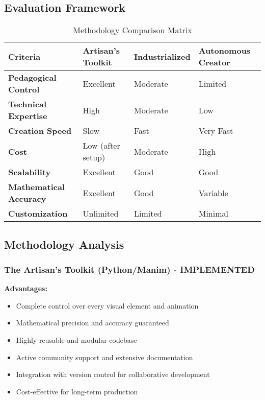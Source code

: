 \documentclass[12pt,a4paper]{article}
\begin{document}
\subsection{Evaluation Framework}
\begin{table}[h]
\centering
\begin{tabular}{|p{3cm}|p{3cm}|p{3cm}|p{3cm}|}
\hline
\textbf{Criteria} & \textbf{Artisan's Toolkit} & \textbf{Industrialized} & \textbf{Autonomous Creator} \\
\hline
\textbf{Pedagogical Control} & \cellcolor{green!20}Excellent & \cellcolor{yellow!20}Moderate & \cellcolor{red!20}Limited \\
\hline
\textbf{Technical Expertise} & \cellcolor{red!20}High & \cellcolor{yellow!20}Moderate & \cellcolor{green!20}Low \\
\hline
\textbf{Creation Speed} & \cellcolor{red!20}Slow & \cellcolor{green!20}Fast & \cellcolor{green!20}Very Fast \\
\hline
\textbf{Cost} & \cellcolor{green!20}Low (after setup) & \cellcolor{yellow!20}Moderate & \cellcolor{red!20}High \\
\hline
\textbf{Scalability} & \cellcolor{green!20}Excellent & \cellcolor{yellow!20}Good & \cellcolor{yellow!20}Good \\
\hline
\textbf{Mathematical Accuracy} & \cellcolor{green!20}Excellent & \cellcolor{yellow!20}Good & \cellcolor{red!20}Variable \\
\hline
\textbf{Customization} & \cellcolor{green!20}Unlimited & \cellcolor{yellow!20}Limited & \cellcolor{red!20}Minimal \\
\hline
\end{tabular}
\caption{Methodology Comparison Matrix}
\end{table}

\subsection{Methodology Analysis}

\subsubsection{The Artisan's Toolkit (Python/Manim) - IMPLEMENTED}
\textbf{Advantages:}
\begin{itemize}
    \item Complete control over every visual element and animation
    \item Mathematical precision and accuracy guaranteed
    \item Highly reusable and modular codebase
    \item Active community support and extensive documentation
    \item Integration with version control for collaborative development
    \item Cost-effective for long-term production
\end{itemize}
\end{document}
